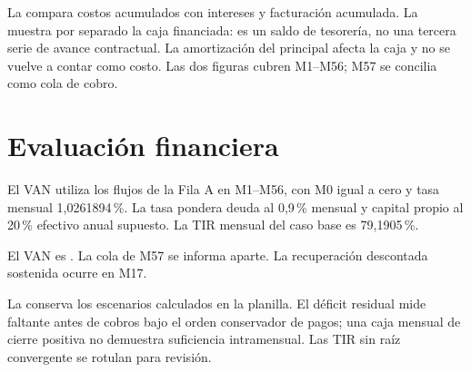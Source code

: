 La  compara costos acumulados con intereses y facturación acumulada.
La  muestra por separado la caja financiada: es un saldo de tesorería,
no una tercera serie de avance contractual. La amortización del principal afecta la caja y no
se vuelve a contar como costo. Las dos figuras cubren M1--M56; M57 se concilia como cola de cobro.


\section{Evaluación financiera}\label{sec:eco-van}

El VAN utiliza los flujos de la Fila A en M1--M56, con M0 igual a cero y tasa mensual 1,0261894\,\%.
La tasa pondera deuda al 0,9\,\% mensual y capital propio al 20\,\% efectivo anual supuesto.
La TIR mensual del caso base es 79,1905\,\%.

El VAN es .
La cola de M57 se informa aparte. La recuperación descontada sostenida ocurre en M17.

La  conserva los escenarios calculados en la planilla. El déficit residual
mide faltante antes de cobros bajo el orden conservador de pagos; una caja mensual de cierre
positiva no demuestra suficiencia intramensual. Las TIR sin raíz convergente se rotulan para revisión.

